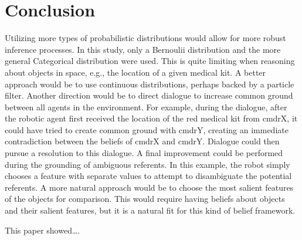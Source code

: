 \documentclass[12pt]{article}
\begin{document}
\section{Conclusion}
\label{sec:conclusion}


Utilizing more types of probabilistic distributions would allow for
more robust inference processes. In this study, only a Bernoulii
distribution and the more general Categorical distribution were
used. This is quite limiting when reasoning about objects in space,
e.g., the location of a given medical kit. A better approach would be
to use continuous distributions, perhaps backed by a particle filter.
Another direction would be to direct dialogue to increase common
ground between all agents in the environment. For example, during the
dialogue, after the robotic agent first received the location of the
red medical kit from cmdrX, it could have tried to create common
ground with cmdrY, creating an immediate contradiction between the
beliefs of cmdrX and cmdrY. Dialogue could then pursue a resolution to
this dialogue. A final improvement could be performed during the
grounding of ambiguous referents. In this example, the robot simply
chooses a feature with separate values to attempt to disambiguate the
potential referents. A more natural approach would be to choose the
most salient features of the objects for comparison. This would
require having beliefs about objects and their salient features, but
it is a natural fit for this kind of belief framework.

This paper showed\dots.
 {\small }
\end{document}
